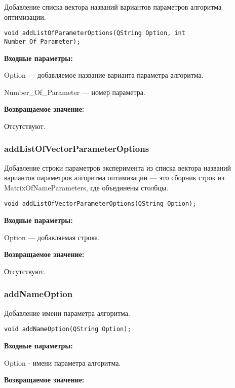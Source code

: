 \documentclass[a4paper,12pt]{article}
\begin{document}
Добавление списка вектора названий вариантов параметров алгоритма оптимизации.


\begin{lstlisting}[label=code_syntax_addListOfParameterOptions,caption=Синтаксис]
void addListOfParameterOptions(QString Option, int Number_Of_Parameter);
\end{lstlisting}

\textbf{Входные параметры:}

Option --- добавляемое название варианта параметра алгоритма.

Number\_Of\_Parameter --- номер параметра.

\textbf{Возвращаемое значение:}

Отсутствуют.


\subsubsection{addListOfVectorParameterOptions}\label{addListOfVectorParameterOptions}

Добавление строки параметров эксперимента из списка вектора названий вариантов параметров алгоритма оптимизации --- это сборник строк из MatrixOfNameParameters, где объединены столбцы.


\begin{lstlisting}[label=code_syntax_addListOfVectorParameterOptions,caption=Синтаксис]
void addListOfVectorParameterOptions(QString Option);
\end{lstlisting}

\textbf{Входные параметры:}

Option --- добавляемая строка.

\textbf{Возвращаемое значение:}

Отсутствуют.


\subsubsection{addNameOption}\label{addNameOption}

Добавление имени параметра алгоритма.


\begin{lstlisting}[label=code_syntax_addNameOption,caption=Синтаксис]
void addNameOption(QString Option);
\end{lstlisting}

\textbf{Входные параметры:}

Option - имени параметра алгоритма.

\textbf{Возвращаемое значение:}
\end{document}

